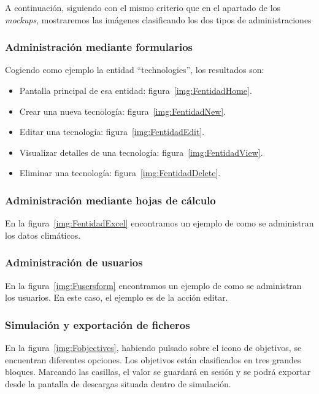 A continuación, siguiendo con el mismo criterio que en el apartado de los \textit{mockups}, mostraremos las imágenes clasificando los dos tipos de administraciones

\subsubsection{Administración mediante formularios} 

Cogiendo como ejemplo la entidad ``technologies'', los resultados son: 

\begin{itemize}
	\item Pantalla principal de esa entidad: figura~\ref{img:FentidadHome}.
	\item Crear una nueva tecnología: figura~\ref{img:FentidadNew}.
	\item Editar una tecnología: figura~\ref{img:FentidadEdit}.
	\item Visualizar detalles de una tecnología: figura~\ref{img:FentidadView}.
	\item Eliminar una tecnología: figura~\ref{img:FentidadDelete}.
\end{itemize}

\subsubsection{Administración mediante hojas de cálculo} 

En la figura~\ref{img:FentidadExcel} encontramos un ejemplo de como se administran los datos climáticos. 

\subsubsection{Administración de usuarios} 

En la figura~\ref{img:Fusersform} encontramos un ejemplo de como se administran los usuarios. En este caso, el ejemplo es de la acción editar. 

\subsubsection{Simulación y exportación de ficheros} 

En la figura~\ref{img:Fobjectives}, habiendo pulsado sobre el icono de objetivos, se encuentran diferentes opciones. Los objetivos están clasificados en tres grandes bloques. Marcando las casillas, el valor se guardará en sesión y se podrá exportar desde la pantalla de descargas situada dentro de simulación.

